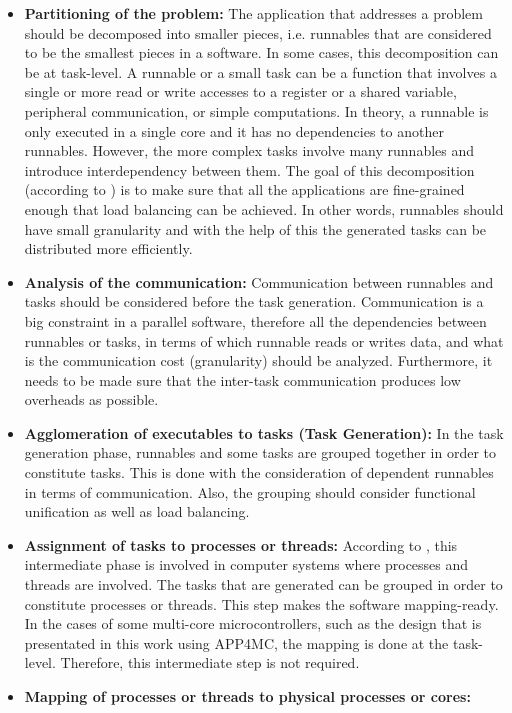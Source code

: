 \begin{itemize}
	\item \textbf{Partitioning of the problem:}
	The application that addresses a problem should be decomposed into smaller pieces, i.e. runnables that are considered to be the smallest pieces in a software. In some cases, this decomposition can be at task-level. A runnable or a small task can be a function that involves a single or more read or write accesses to a register or a shared variable, peripheral communication, or simple computations. In theory, a runnable is only executed in a single core and it has no dependencies to another runnables. However, the more complex tasks involve many runnables and introduce interdependency between them. The goal of this decomposition (according to \cite{springerparallel}) is to make sure that all the applications are fine-grained enough that load balancing can be achieved. In other words, runnables should have small granularity and with the help of this the generated tasks can be distributed more efficiently.
	\item \textbf{Analysis of the communication:} Communication between runnables and tasks should be considered before the task generation. Communication is a big constraint in a parallel software, therefore all the dependencies between runnables or tasks, in terms of which runnable reads or writes data, and what is the communication cost (granularity) should be analyzed. Furthermore, it needs to be made sure that the inter-task communication produces low overheads as possible.
	\item \textbf{Agglomeration of executables to tasks (Task Generation):}
	In the task generation phase, runnables and some tasks are grouped together in order to constitute tasks. This is done with the consideration of dependent runnables in terms of communication. Also, the grouping should consider functional unification as well as load balancing. 
	\item \textbf{Assignment of tasks to processes or threads:}
	According to \cite{springerparallel}, this intermediate phase is involved in computer systems where processes and threads are involved. The tasks that are generated can be grouped in order to constitute processes or threads. This step makes the software mapping-ready. In the cases of some multi-core microcontrollers, such as the design that is presentated in this work using APP4MC, the mapping is done at the task-level. Therefore, this intermediate step is not required.
	\item \textbf{Mapping of processes or threads to physical processes or cores:}

\end{itemize}
